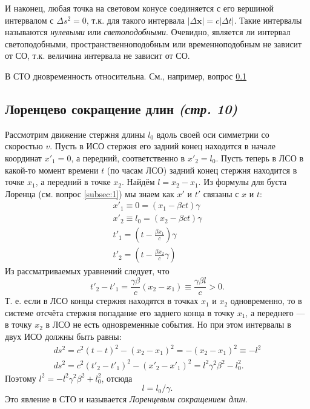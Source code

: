 \documentclass[a4paper,12pt]{article}
\begin{document}
И наконец, любая точка на световом конусе соединяется с его вершиной интервалом
с $\Delta s^2 = 0$,  т.\:к. для такого интервала $|\Delta \mathbf{x}|=c
|\Delta t|$. Такие интервалы называются  \emph{нулевыми} или \emph{светоподобными}.
Очевидно, является ли интервал светоподобными, пространственноподобным или
временноподобным не зависит от СО, т.\:к. величина интервала не зависит от
СО.

В СТО дновременность относительна. См., например, вопрос \ref{subsec:3}
\subsection{Лоренцево сокращение длин \emph{(стр. 10)}}
\label{subsec:3}
Рассмотрим движение стержня длины $l_0$ вдоль своей оси симметрии со скоростью
$v$. Пусть в ИСО стержня его задний конец находится в начале координат  $x'_1=0$,
а передний, соответственно в  $x'_2=l_0$. Пусть теперь в ЛСО в какой-то момент
времени  $t$ (по часам ЛСО) задний конец стержня находится в точке $x_1$, а
передний в точке $x_2$. Найдём  $l=x_2-x_1$.
Из формулы для буста Лоренца (см. вопрос \ref{subsec:1}) мы знаем как $x'$ и
$t'$ связаны с  $x$ и  $t$:
\begin{gather*}
	x'_1\equiv 0 = (x_1-\beta c t)\gamma\\
	x'_2\equiv l_0 = (x_2-\beta c t)\gamma\\
	t'_1=\left( t-\frac{\beta x_1}{c} \right) \gamma\\
	t'_2=\left( t-\frac{\beta x_2}{c}\gamma \right) 
\end{gather*}
Из рассматриваемых уравнений следует, что
\[
	t'_2-t'_1=\frac{\gamma \beta}{c}(x_2-x_1)\equiv \frac{\gamma\beta l}{c} > 0
.\]
Т. е. если в ЛСО концы стержня находятся в точках $x_1$ и $x_2$ одновременно,
то в системе отсчёта стержня попадание его заднего конца в точку  $x_1$, а
переднего --- в точку  $x_2$ в ЛСО не есть одновременные события. Но при этом
интервалы в двух ИСО должны быть равны:
\begin{gather*}
	ds^2=c^2(t-t)^2-(x_2-x_1)^2=-(x_2-x_1)^2\equiv -l^2\\
	ds^2=c^2(t'_2-t'_1)^2-(x'_2-x'_1)^2=l^2\gamma^2\beta^2-l_0^2
.\end{gather*}
Поэтому $l^2=-l^2\gamma^2 \beta^2+l_0^2$, отсюда
\[
l=l_0 /\gamma
.\]
Это явление в СТО и называется \emph{Лоренцевым сокращением длин}.
\end{document}
